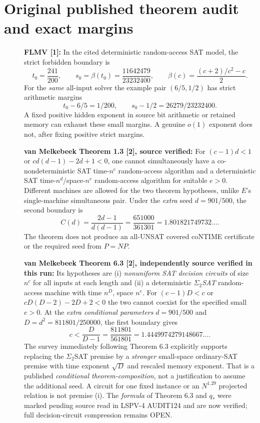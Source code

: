 \documentclass[11pt]{article}
\begin{document}
\section{Original published theorem audit and exact margins}
\begin{description}
\item[] \textbf{FLMV [1]:} In the cited deterministic random-access SAT model, the strict forbidden boundary is
\[
 t_0=\frac{241}{200},\qquad
 s_0=\beta(t_0)=\frac{11642479}{23232400},\qquad
 \beta(c)=\frac{(c+2)/c^2-c}{2}.
\]
For the \emph{same} all-input solver the example pair $(6/5,1/2)$ has strict arithmetic margins
\[
 t_0-6/5=1/200,\qquad s_0-1/2=26279/23232400.
\]
A fixed positive hidden exponent in source bit arithmetic or retained memory can exhaust these small margins. A genuine $o(1)$ exponent does not, after fixing positive strict margins.
\item[] \textbf{van Melkebeek Theorem 1.3 [2], source verified:} For $(c-1)d<1$ or $cd(d-1)-2d+1<0$, one cannot simultaneously have a co-nondeterministic SAT time-$n^c$ random-access algorithm and a deterministic SAT time-$n^d$/space-$n^e$ random-access algorithm for suitable $e>0$. Different machines are allowed for the two theorem hypotheses, unlike $E$'s single-machine simultaneous pair. Under the \emph{extra} seed $d=901/500$, the second boundary is
\[
 C(d)=\frac{2d-1}{d(d-1)}
 =\frac{651000}{361301}=1.801821749732\ldots.
\]
The theorem does not produce an all-UNSAT covered coNTIME certificate or the required seed from $P=NP$.
\item[] \textbf{van Melkebeek Theorem 6.3 [2], independently source verified in this run:} Its hypotheses are (i) \emph{nonuniform SAT decision circuits} of size $n^c$ for all inputs at each length and (ii) a deterministic \emph{$\Sigma_2$SAT} random-access machine with time $n^D$, space $n^e$. For $(c-1)D<c$ or $cD(D-2)-2D+2<0$ the two cannot coexist for the specified small $e>0$. At the \emph{extra conditional parameters} $d=901/500$ and $D=d^2=811801/250000$, the first boundary gives
\[
 c<\frac{D}{D-1}
 =\frac{811801}{561801}=1.4449974279148667\ldots.
\]
The survey immediately following Theorem 6.3 explicitly supports replacing the $\Sigma_2$SAT premise by a \emph{stronger} small-space ordinary-SAT premise with time exponent $\sqrt D$ and rescaled memory exponent. That is a published \emph{conditional theorem-composition}, not a justification to assume the additional seed. A circuit for one fixed instance or an $N^{1.29}$ projected relation is not premise (i). The \emph{formula} of Theorem 6.3 and $q_*$ were marked pending source read in LSPV-4 AUDIT124 and are now verified; full decision-circuit compression remains OPEN.

\end{description}
\end{document}
